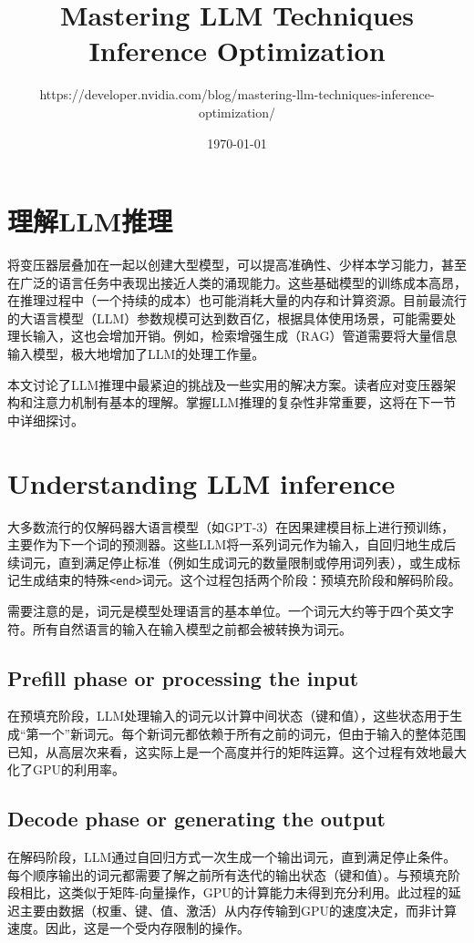 \documentclass[twocolumn, 10pt]{article} %
\theoremstyle{remark}
\begin{document}
\title{Mastering LLM Techniques Inference Optimization}
\author{https://developer.nvidia.com/blog/mastering-llm-techniques-inference-optimization/}
\date{\today}
\maketitle


\section{理解LLM推理}

将变压器层叠加在一起以创建大型模型，可以提高准确性、少样本学习能力，甚至在广泛的语言任务中表现出接近人类的涌现能力。这些基础模型的训练成本高昂，在推理过程中（一个持续的成本）也可能消耗大量的内存和计算资源。目前最流行的大语言模型（LLM）参数规模可达到数百亿，根据具体使用场景，可能需要处理长输入，这也会增加开销。例如，检索增强生成（RAG）管道需要将大量信息输入模型，极大地增加了LLM的处理工作量。

本文讨论了LLM推理中最紧迫的挑战及一些实用的解决方案。读者应对变压器架构和注意力机制有基本的理解。掌握LLM推理的复杂性非常重要，这将在下一节中详细探讨。

\section{Understanding LLM inference}

大多数流行的仅解码器大语言模型（如GPT-3）在因果建模目标上进行预训练，主要作为下一个词的预测器。这些LLM将一系列词元作为输入，自回归地生成后续词元，直到满足停止标准（例如生成词元的数量限制或停用词列表），或生成标记生成结束的特殊\texttt{<end>}词元。这个过程包括两个阶段：预填充阶段和解码阶段。

需要注意的是，词元是模型处理语言的基本单位。一个词元大约等于四个英文字符。所有自然语言的输入在输入模型之前都会被转换为词元。

\subsection{Prefill phase or processing the input}
在预填充阶段，LLM处理输入的词元以计算中间状态（键和值），这些状态用于生成“第一个”新词元。每个新词元都依赖于所有之前的词元，但由于输入的整体范围已知，从高层次来看，这实际上是一个高度并行的矩阵运算。这个过程有效地最大化了GPU的利用率。

\subsection{Decode phase or generating the output}
在解码阶段，LLM通过自回归方式一次生成一个输出词元，直到满足停止条件。每个顺序输出的词元都需要了解之前所有迭代的输出状态（键和值）。与预填充阶段相比，这类似于矩阵-向量操作，GPU的计算能力未得到充分利用。此过程的延迟主要由数据（权重、键、值、激活）从内存传输到GPU的速度决定，而非计算速度。因此，这是一个受内存限制的操作。
\end{document}
